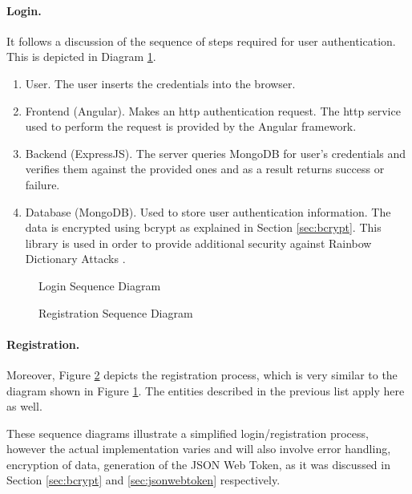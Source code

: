 \documentclass[multi, tikz, a4paper, oneside]{article}
\begin{document}
\paragraph{Login.}
It follows a discussion of the sequence of steps required for user
authentication. This is depicted in Diagram \ref{fig:login}.

\begin{enumerate}
  \item User. The user inserts the credentials into the browser.
  \item Frontend (Angular). Makes an http authentication request. The http
    service used to perform the request is provided by the Angular framework.
  \item Backend (ExpressJS). The server queries MongoDB for user's credentials
    and verifies them against the provided ones and as a result returns success
    or failure.
  \item Database (MongoDB). Used to store user authentication information. The
    data is encrypted using bcrypt as explained in Section \ref{sec:bcrypt}.
    This library is used in order to provide additional security against Rainbow
    Dictionary Attacks \autocite{wiki:rainbow-attacks}.
\end{enumerate}

\begin{figure}[h]
  \centering
  
  \caption{Login Sequence Diagram}
  \label{fig:login}
\end{figure}


\begin{figure}[h]
  \centering
  
  \caption{Registration Sequence Diagram}
  \label{fig:register}
\end{figure}

\paragraph{Registration.}
Moreover, Figure \ref{fig:register} depicts the registration process, which is
very similar to the diagram shown in Figure \ref{fig:login}. The entities
described in the previous list apply here as well.

These sequence diagrams illustrate a simplified login/registration process,
however the actual implementation varies and will also involve error handling,
encryption of data, generation of the JSON Web Token, as it was discussed in
Section \ref{sec:bcrypt} and \ref{sec:jsonwebtoken} respectively.
\end{document}
